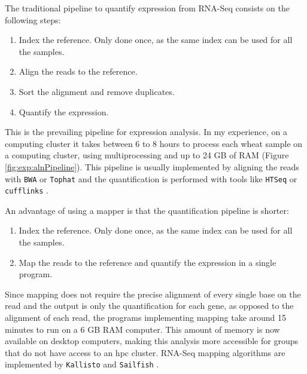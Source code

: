 The traditional pipeline to quantify expression from RNA-Seq consists on the following steps:
\begin{enumerate}
  \item Index the reference. Only done once, as the same index can be used for all the samples. 
  \item Align the reads to the reference. 
  \item Sort the alignment and remove duplicates. 
  \item Quantify the expression.  
\end{enumerate}
This is the prevailing pipeline for expression analysis. 
In my experience, on a computing cluster it takes between 6 to 8 hours to process each wheat sample on a computing cluster, using multiprocessing and up to 24 GB of RAM (Figure \ref{fig:exp:alnPipeline}). 
This pipeline is usually implemented by aligning the reads with \verb|BWA| \citep{Li2009} or \verb|Tophat|  \citep{Trapnell2012} and the quantification is performed with tools like \verb|HTSeq| \citep{Anders2015} or \verb|cufflinks| \citep{Trapnell2012}.

An advantage of using a mapper is that the quantification pipeline is shorter:
\begin{enumerate}
  \item Index the reference. Only done once, as the same index can be used for all the samples. 
  \item Map the reads to the reference and quantify the expression in a single program.   
\end{enumerate}
Since mapping does not require the precise alignment of every single base on the read and the output is only the quantification for each gene, as opposed to the alignment of each read, the programs implementing mapping take around 15 minutes to run on a 6 GB RAM computer.
This amount of memory is now available on desktop computers, making this analysis more accessible for groups that do not have access to an \gls{hpc} cluster.
RNA-Seq mapping algorithms are implemented by \verb|Kallisto|  \citep{Bray2016} and \verb|Sailfish| \citep{Patro2014}.

